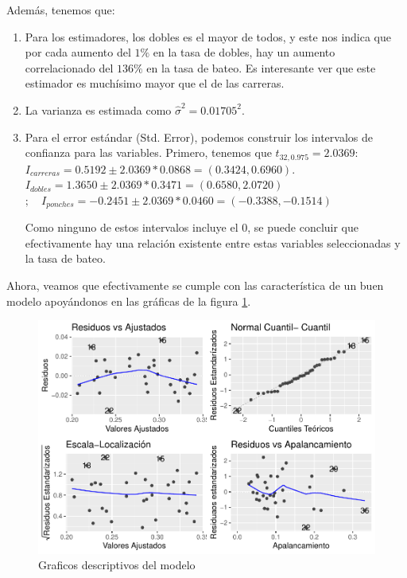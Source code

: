 \documentclass{staprojteamusb}
\begin{document}
 Además, tenemos que:

 \begin{enumerate}
   \item Para los estimadores, los dobles es el mayor de todos, y este nos indica que por cada aumento del $1\%$ en la tasa de dobles, hay un aumento correlacionado del $136\%$ en la tasa de bateo. Es interesante ver que este estimador es muchísimo mayor que el de las carreras.
   \item La varianza es estimada como $\hat{\sigma}^2 = 0.01705^2$.
   \item Para el error estándar (Std. Error), podemos construir los intervalos de confianza para las variables. Primero, tenemos que $t_{32, 0.975} = 2.0369$: $I_{carreras} = 0.5192 \pm 2.0369*0.0868 = (0.3424, 0.6960)$. \linebreak $I_{dobles} = 1.3650 \pm 2.0369*0.3471 = (0.6580, 2.0720)$ $;\quad I_{ponches} = -0.2451 \pm 2.0369*0.0460 = (-0.3388, -0.1514)$
   
 Como ninguno de estos intervalos incluye el $0$, se puede concluir que efectivamente hay una relación existente entre estas variables seleccionadas y la tasa de bateo.
 \end{enumerate}

 Ahora, veamos que efectivamente se cumple con las característica de un buen modelo apoyándonos en las gráficas de la figura \ref{fig:modelo}.

 \begin{figure}
 \centering
 \includegraphics{C03322-InformeFinal-Cordero-Gavazut-Riera_files/figure-latex/modelo-1.pdf}
 \caption{\label{fig:modelo}Graficos descriptivos del modelo}
 \end{figure}
\end{document}

